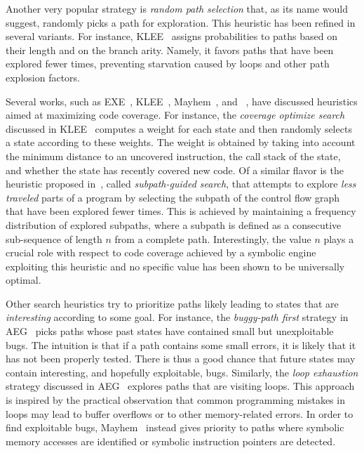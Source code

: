 Another very popular strategy is {\em random path selection} that, as its name would suggest, randomly picks a path for exploration. This heuristic has been refined in several variants. For instance, {\sc KLEE}~\cite{KLEE-OSDI08} assigns probabilities to paths based on their length and on the branch arity. Namely, it favors paths that have been explored fewer times, preventing starvation caused by loops and other path explosion factors.

Several works, such as {\sc EXE}~\cite{EXE-CCS06}, {\sc KLEE}~\cite{KLEE-OSDI08}, {\sc Mayhem}~\cite{MAYHEM-SP12}, and {\sc \stwoe}~\cite{CKC-TOCS12}, have discussed heuristics aimed at maximizing code coverage. For instance, the {\em coverage optimize search} discussed in {\sc KLEE}~\cite{KLEE-OSDI08} computes a weight for each state and then randomly selects a state according to these weights. The weight is obtained by taking into account the minimum distance to an uncovered instruction, the call stack of the state, and whether the state has recently covered new code. Of a similar flavor is the heuristic proposed in~\cite{LZL-OOPSLA13}, called {\em subpath-guided search}, that attempts to explore {\it less traveled} parts of a program by selecting the subpath of the control flow graph that have been explored fewer times. This is achieved by maintaining a frequency distribution of explored subpaths, where a subpath is defined as a consecutive sub-sequence of length $n$ from a complete path. Interestingly, the value $n$ plays a crucial role with respect to code coverage achieved by a symbolic engine exploiting this heuristic and no specific value has been shown to be universally optimal.

Other search heuristics try to prioritize paths likely leading to states that are {\em interesting} according to some goal. For instance, the {\em buggy-path first} strategy in {\sc AEG}~\cite{AEG-NDSS11} picks paths whose past states have contained small but unexploitable bugs. The intuition is that if a path contains some small errors, it is likely that it has not been properly tested. There is thus a good chance that future states may contain interesting, and hopefully exploitable, bugs. Similarly, the {\em loop exhaustion} strategy discussed in {\sc AEG}~\cite{AEG-NDSS11} explores paths that are visiting loops. This approach is inspired by the practical observation that common programming mistakes in loops may lead to buffer overflows or to other memory-related errors. In order to find exploitable bugs, {\sc Mayhem}~\cite{MAYHEM-SP12} instead gives priority to paths where symbolic memory accesses are identified or symbolic instruction pointers are detected. 

